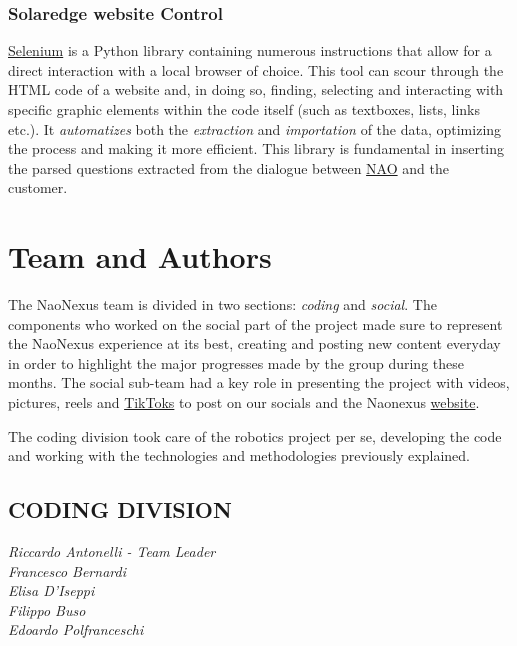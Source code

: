 \documentclass{optica-article}
\begin{document}
\subsubsection{Solaredge website Control}\label{sec:solaredge_website_control}
\href{https://www.selenium.dev/documentation/}{Selenium} is a Python library containing numerous instructions that allow for a direct interaction with a local browser of choice. This tool can scour through the HTML code of a website and, in doing so, finding, selecting and interacting with specific graphic elements within the code itself (such as textboxes, lists, links etc.). It \emph{automatizes} both the \emph{extraction} and \emph{importation} of the data, optimizing the process and making it more efficient. This library is fundamental in inserting the parsed questions extracted from the dialogue between \hyperref[sec:solaredge_nao]{NAO} and the customer.

\section{Team and Authors}\label{sec:team_authors}
The NaoNexus team is divided in two sections: \emph{coding} and \emph{social}. The components who worked on the social part of the project made sure to represent the NaoNexus experience at its best, creating and posting new content everyday in order to highlight the major progresses made by the group during these months. The social sub-team had a key role in presenting the project with videos, pictures, reels and \href{https://www.tiktok.com/@naonexus}{TikToks} to post on our socials and the Naonexus \href{https://www.naonexus.altervista.org}{website}.

\bigskip
\noindent
The coding division took care of the robotics project per se, developing the code and working with the technologies and methodologies previously explained.\\

\subsection{CODING DIVISION}

\noindent\emph{Riccardo Antonelli - Team Leader}\\
\emph{Francesco Bernardi}\\
\emph{Elisa D'Iseppi}\\
\emph{Filippo Buso}\\
\emph{Edoardo Polfranceschi}\\
\end{document}

